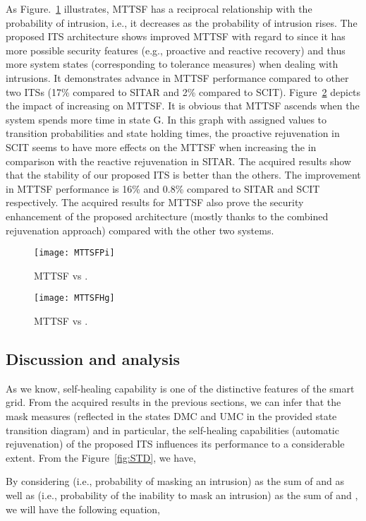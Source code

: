 \documentclass[preprint,number,12pt]{elsarticle}
\begin{document}
As Figure.~\ref{fig:MTTSFpI} illustrates, MTTSF has a reciprocal relationship with the probability of intrusion, i.e., it decreases as the probability of intrusion rises. The proposed ITS architecture shows improved MTTSF with regard to  since it has more possible security features (e.g., proactive and reactive recovery) and thus more system states (corresponding to tolerance measures) when dealing with intrusions. It demonstrates advance in MTTSF performance compared to other two ITSs (17\% compared to SITAR and 2\% compared to SCIT). Figure~\ref{fig:MTTSFhG} depicts the impact of increasing  on MTTSF. It is obvious that MTTSF ascends when the system spends more time in state G. In this graph with assigned values to transition probabilities and state holding times, the proactive rejuvenation in SCIT seems to have more effects on the MTTSF when increasing the  in comparison with the reactive rejuvenation in SITAR. The acquired results show that the stability of our proposed ITS is better than the others. The improvement in MTTSF performance is 16\% and 0.8\% compared to SITAR and SCIT respectively. The acquired results for MTTSF also prove the security enhancement of the proposed architecture (mostly thanks to the combined rejuvenation approach) compared with the other two systems.
\begin{figure}[!t]
\centering
\texttt{[image: MTTSFPi]}
\caption{MTTSF vs .}
\label{fig:MTTSFpI}
\end{figure}
\begin{figure}[!t]
\centering
\texttt{[image: MTTSFHg]}
\caption{MTTSF vs .}
\label{fig:MTTSFhG}
\end{figure}
\subsection{Discussion and analysis}
As we know, self-healing capability is one of the distinctive features of the smart grid. From the acquired results in the previous sections, we can infer that the mask measures (reflected in the states DMC and UMC in the provided state transition diagram) and in particular, the self-healing capabilities (automatic rejuvenation) of the proposed ITS influences its performance to a considerable extent. From the Figure~\ref{fig:STD}, we have,

By considering  (i.e., probability of masking an intrusion) as the sum of  and  as well as  (i.e., probability of the inability to mask an intrusion) as the sum of  and , we will have the following equation,
\end{document}
